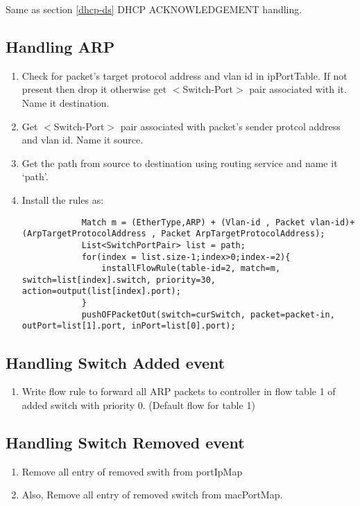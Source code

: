 \documentclass{article}
\begin{document}
Same as section \ref{dhcp-ds} DHCP ACKNOWLEDGEMENT handling.

\subsection{Handling ARP}

\begin{enumerate}
	\item Check for packet's target protocol address and vlan id in ipPortTable. If not present then drop it otherwise get $<$Switch-Port$>$ pair associated with it. Name it destination.
	\item Get $<$Switch-Port$>$ pair associated with packet's sender protcol address and vlan id. Name it source.
	\item Get the path from source to destination using routing service and name it `path'.
	\item Install the rules as:
		\begin{lstlisting}
			Match m = (EtherType,ARP) + (Vlan-id , Packet vlan-id)+(ArpTargetProtocolAddress , Packet ArpTargetProtocolAddress);
			List<SwitchPortPair> list = path;
			for(index = list.size-1;index>0;index-=2){
				installFlowRule(table-id=2, match=m, switch=list[index].switch, priority=30, action=output(list[index].port);
			}
			pushOFPacketOut(switch=curSwitch, packet=packet-in, outPort=list[1].port, inPort=list[0].port);
		\end{lstlisting}
\end{enumerate}

\subsection{Handling Switch Added event}

\begin{enumerate}
	\item Write flow rule to forward all ARP packets to controller in flow table 1 of added switch with priority 0. (Default flow for table 1) 
\end{enumerate}



\subsection{Handling Switch Removed event}

\begin{enumerate}
	\item Remove all entry of removed swith from portIpMap
	\item Also, Remove all entry of removed switch from macPortMap.
\end{enumerate}

\printbibliography
\end{document}
